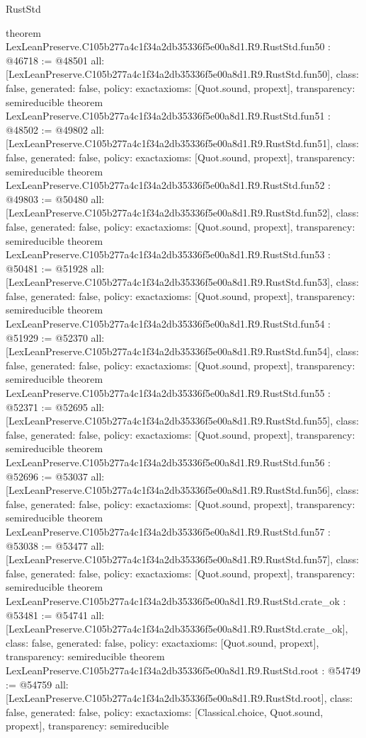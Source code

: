 \begin{lexlean}{RustStd}
\begin{coremodule}
{}
theorem LexLeanPreserve.C105b277a4c1f34a2db35336f5e00a8d1.R9.RustStd.fun50 : @46718 := @48501 {
  all: [LexLeanPreserve.C105b277a4c1f34a2db35336f5e00a8d1.R9.RustStd.fun50],
  class: false,
  generated: false,
  policy: exact{axioms: [Quot.sound, propext]},
  transparency: semireducible
}
theorem LexLeanPreserve.C105b277a4c1f34a2db35336f5e00a8d1.R9.RustStd.fun51 : @48502 := @49802 {
  all: [LexLeanPreserve.C105b277a4c1f34a2db35336f5e00a8d1.R9.RustStd.fun51],
  class: false,
  generated: false,
  policy: exact{axioms: [Quot.sound, propext]},
  transparency: semireducible
}
theorem LexLeanPreserve.C105b277a4c1f34a2db35336f5e00a8d1.R9.RustStd.fun52 : @49803 := @50480 {
  all: [LexLeanPreserve.C105b277a4c1f34a2db35336f5e00a8d1.R9.RustStd.fun52],
  class: false,
  generated: false,
  policy: exact{axioms: [Quot.sound, propext]},
  transparency: semireducible
}
theorem LexLeanPreserve.C105b277a4c1f34a2db35336f5e00a8d1.R9.RustStd.fun53 : @50481 := @51928 {
  all: [LexLeanPreserve.C105b277a4c1f34a2db35336f5e00a8d1.R9.RustStd.fun53],
  class: false,
  generated: false,
  policy: exact{axioms: [Quot.sound, propext]},
  transparency: semireducible
}
theorem LexLeanPreserve.C105b277a4c1f34a2db35336f5e00a8d1.R9.RustStd.fun54 : @51929 := @52370 {
  all: [LexLeanPreserve.C105b277a4c1f34a2db35336f5e00a8d1.R9.RustStd.fun54],
  class: false,
  generated: false,
  policy: exact{axioms: [Quot.sound, propext]},
  transparency: semireducible
}
theorem LexLeanPreserve.C105b277a4c1f34a2db35336f5e00a8d1.R9.RustStd.fun55 : @52371 := @52695 {
  all: [LexLeanPreserve.C105b277a4c1f34a2db35336f5e00a8d1.R9.RustStd.fun55],
  class: false,
  generated: false,
  policy: exact{axioms: [Quot.sound, propext]},
  transparency: semireducible
}
theorem LexLeanPreserve.C105b277a4c1f34a2db35336f5e00a8d1.R9.RustStd.fun56 : @52696 := @53037 {
  all: [LexLeanPreserve.C105b277a4c1f34a2db35336f5e00a8d1.R9.RustStd.fun56],
  class: false,
  generated: false,
  policy: exact{axioms: [Quot.sound, propext]},
  transparency: semireducible
}
theorem LexLeanPreserve.C105b277a4c1f34a2db35336f5e00a8d1.R9.RustStd.fun57 : @53038 := @53477 {
  all: [LexLeanPreserve.C105b277a4c1f34a2db35336f5e00a8d1.R9.RustStd.fun57],
  class: false,
  generated: false,
  policy: exact{axioms: [Quot.sound, propext]},
  transparency: semireducible
}
theorem LexLeanPreserve.C105b277a4c1f34a2db35336f5e00a8d1.R9.RustStd.crate_ok : @53481 := @54741 {
  all: [LexLeanPreserve.C105b277a4c1f34a2db35336f5e00a8d1.R9.RustStd.crate_ok],
  class: false,
  generated: false,
  policy: exact{axioms: [Quot.sound, propext]},
  transparency: semireducible
}
theorem LexLeanPreserve.C105b277a4c1f34a2db35336f5e00a8d1.R9.RustStd.root : @54749 := @54759 {
  all: [LexLeanPreserve.C105b277a4c1f34a2db35336f5e00a8d1.R9.RustStd.root],
  class: false,
  generated: false,
  policy: exact{axioms: [Classical.choice, Quot.sound, propext]},
  transparency: semireducible
}


\end{coremodule}
\end{lexlean}
